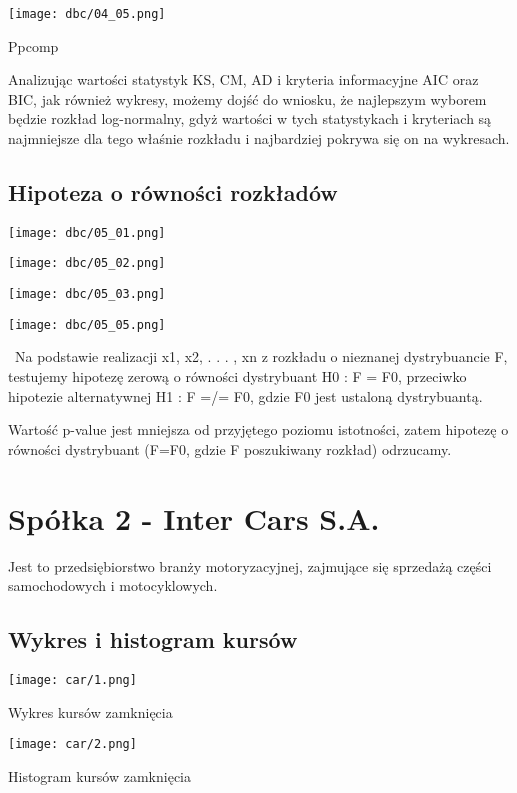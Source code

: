 \documentclass[a4paper,11pt]{article}
\def\\{\hfill\break}
\begin{document}
\centerline{\texttt{[image: dbc/04\_05.png]}}
\centerline{Ppcomp}

Analizując wartości statystyk KS, CM, AD i kryteria informacyjne AIC oraz  BIC, jak również wykresy, możemy dojść do wniosku, że najlepszym wyborem będzie rozkład log-normalny, gdyż wartości w tych statystykach i kryteriach są najmniejsze dla tego właśnie rozkładu i najbardziej pokrywa się on na wykresach. 

\subsection{Hipoteza o równości rozkładów}
\centerline{\texttt{[image: dbc/05\_01.png]}}\\
\centerline{\texttt{[image: dbc/05\_02.png]}}\\
\centerline{\texttt{[image: dbc/05\_03.png]}}\\
\centerline{\texttt{[image: dbc/05\_05.png]}}\\\
Na podstawie realizacji x1, x2, . . . , xn z rozkładu o nieznanej dystrybuancie F, testujemy hipotezę zerową o równości dystrybuant H0 : F = F0, przeciwko hipotezie alternatywnej  H1 : F =/= F0, gdzie F0 jest ustaloną dystrybuantą. 

Wartość p-value jest mniejsza od przyjętego poziomu istotności, zatem hipotezę o równości dystrybuant (F=F0, gdzie F poszukiwany rozkład) odrzucamy. 


\newpage

\maketitle
\section{Spółka 2 - Inter Cars S.A.}
Jest to przedsiębiorstwo branży motoryzacyjnej, zajmujące się sprzedażą części samochodowych i motocyklowych.
\subsection{Wykres i histogram kursów}
\centerline{\texttt{[image: car/1.png]}}
\centerline{Wykres kursów zamknięcia}
\centerline{\texttt{[image: car/2.png]}}
\centerline{Histogram kursów zamknięcia}
\end{document}
